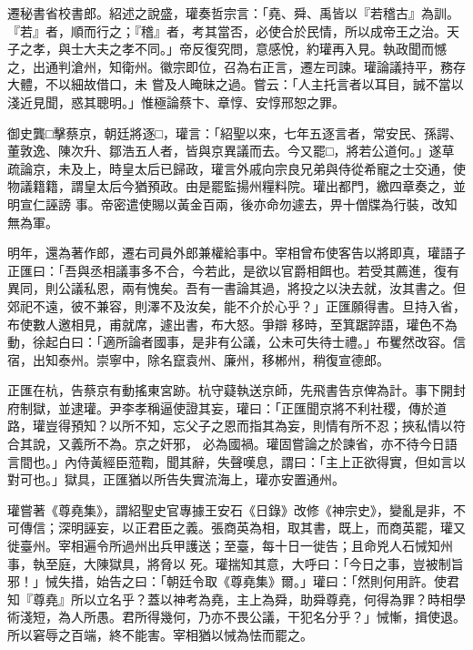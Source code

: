 \begin{pinyinscope}
 遷秘書省校書郎。紹述之說盛，瓘奏哲宗言：「堯、舜、禹皆以『若稽古』為訓。『若』者，順而行之；『稽』者，考其當否，必使合於民情，所以成帝王之治。天子之孝，與士大夫之孝不同。」帝反復究問，意感悅，約瓘再入見。執政聞而憾之，出通判滄州，知衛州。徽宗即位，召為右正言，遷左司諫。瓘論議持平，務存大體，不以細故借口，未
 嘗及人晻昧之過。嘗云：「人主托言者以耳目，誠不當以淺近見聞，惑其聰明。」惟極論蔡卞、章惇、安惇邢恕之罪。



 御史龔□擊蔡京，朝廷將逐□，瓘言：「紹聖以來，七年五逐言者，常安民、孫諤、董敦逸、陳次升、鄒浩五人者，皆與京異議而去。今又罷□，將若公道何。」遂草疏論京，未及上，時皇太后已歸政，瓘言外戚向宗良兄弟與侍從希寵之士交通，使物議籍籍，謂皇太后今猶預政。由是罷監揚州糧料院。瓘出都門，繳四章奏之，並明宣仁誣謗
 事。帝密遣使賜以黃金百兩，後亦命勿遽去，畀十僧牒為行裝，改知無為軍。



 明年，還為著作郎，遷右司員外郎兼權給事中。宰相曾布使客告以將即真，瓘語子正匯曰：「吾與丞相議事多不合，今若此，是欲以官爵相餌也。若受其薦進，復有異同，則公議私恩，兩有愧矣。吾有一書論其過，將投之以決去就，汝其書之。但郊祀不遠，彼不兼容，則澤不及汝矣，能不介於心乎？」正匯願得書。旦持入省，布使數人邀相見，甫就席，遽出書，布大怒。爭辯
 移時，至箕踞誶語，瓘色不為動，徐起白曰：「適所論者國事，是非有公議，公未可失待士禮。」布矍然改容。信宿，出知泰州。崇寧中，除名竄袁州、廉州，移郴州，稍復宣德郎。



 正匯在杭，告蔡京有動搖東宮跡。杭守薿執送京師，先飛書告京俾為計。事下開封府制獄，並逮瓘。尹李孝稱逼使證其妄，瓘曰：「正匯聞京將不利社稷，傳於道路，瓘豈得預知？以所不知，忘父子之恩而指其為妄，則情有所不忍；挾私情以符合其說，又義所不為。京之奸邪，
 必為國禍。瓘固嘗論之於諫省，亦不待今日語言間也。」內侍黃經臣蒞鞫，聞其辭，失聲嘆息，謂曰：「主上正欲得實，但如言以對可也。」獄具，正匯猶以所告失實流海上，瓘亦安置通州。



 瓘嘗著《尊堯集》，謂紹聖史官專據王安石《日錄》改修《神宗史》，變亂是非，不可傳信；深明誣妄，以正君臣之義。張商英為相，取其書，既上，而商英罷，瓘又徙臺州。宰相遍令所過州出兵甲護送；至臺，每十日一徙告；且命兇人石悈知州事，執至庭，大陳獄具，將脅以
 死。瓘揣知其意，大呼曰：「今日之事，豈被制旨邪！」悈失措，始告之曰：「朝廷令取《尊堯集》爾。」瓘曰：「然則何用許。使君知『尊堯』所以立名乎？蓋以神考為堯，主上為舜，助舜尊堯，何得為罪？時相學術淺短，為人所愚。君所得幾何，乃亦不畏公議，干犯名分乎？」悈慚，揖使退。所以窘辱之百端，終不能害。宰相猶以悈為怯而罷之。




\end{pinyinscope}
